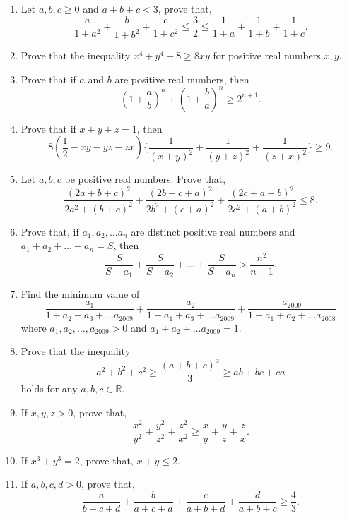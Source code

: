 \documentclass[11pt, a4paper]{article}
\begin{document}
\begin{enumerate}
	\item Let $a, b, c \geq 0$ and $a+b+c < 3$, prove that, $$\dfrac{a}{1+a^2} + \dfrac{b}{1+b^2} + \dfrac{c}{1+c^2} \leq \dfrac{3}{2} \leq \dfrac{1}{1+a} + \dfrac{1}{1+b} + \dfrac{1}{1+c}.$$
	
	\item Prove that the inequality $x^4 + y^4 + 8 \geq 8xy$ for positive real numbers $x, y$.
	
	\item Prove that if $a$ and $b$ are positive real numbers, then $$\left( 1 + \dfrac{a}{b} \right)^n + \left( 1 + \dfrac{b}{a} \right)^n \geq 2^{n+1}.$$
	
	\item Prove that if $x + y + z = 1$, then $$8 \left( \dfrac{1}{2} - xy - yz - zx \right) \Bigg\{\dfrac{1}{(x+y)^2} + \dfrac{1}{(y+z)^2} + \dfrac{1}{(z+x)^2} \Bigg\} \geq 9.$$
	
	\item Let $a, b, c$ be positive real numbers. Prove that, $$\dfrac{(2a + b + c)^2}{2a^2 + (b+c)^2} + \dfrac{(2b + c + a)^2}{2b^2 + (c+a)^2} + \dfrac{(2c + a + b)^2}{2c^2 + (a+b)^2} \leq 8.$$
	
	\item Prove that, if $a_1, a_2, \ldots a_n$ are distinct positive real numbers and $a_1 + a_2 + \ldots + a_n = S$, then
	$$\dfrac{S}{S - a_1} + \dfrac{S}{S - a_2} + \ldots + \dfrac{S}{S - a_n} > \dfrac{n^2}{n-1}.$$
	
	\item Find the minimum value of 
	$$\dfrac{a_1}{1 + a_2 + a_3 + \ldots a_{2009}} + \dfrac{a_2}{1 + a_1 + a_3 + \ldots a_{2009}} + \dfrac{a_{2009}}{1 + a_1 + a_2 + \ldots a_{2008}}$$ where $a_1, a_2, \ldots, a_{2009} > 0$ and $a_1 + a_2 + \ldots a_{2009} = 1$.
	
	\item Prove that the inequality
$$a^2 + b^2 + c^2 \geq \dfrac{(a+b+c)^2}{3} \geq ab + bc + ca$$ holds for any $a, b, c \in \mathbb{R}$.

	\item If $x, y, z > 0$, prove that, $$\dfrac{x^2}{y^2} + \dfrac{y^2}{z^2} + \dfrac{z^2}{x^2} \geq \dfrac{x}{y} + \dfrac{y}{z} + \dfrac{z}{x}.$$
	
	\item If $x^3 + y^3 = 2$, prove that, $x + y \leq 2$.
	
	\item If $a, b, c, d > 0$, prove that, $$\dfrac{a}{b+c+d} + \dfrac{b}{a+c+d} + \dfrac{c}{a+b+d} + \dfrac{d}{a+b+c} \geq \dfrac{4}{3}.$$
	

\end{enumerate}
\end{document}

